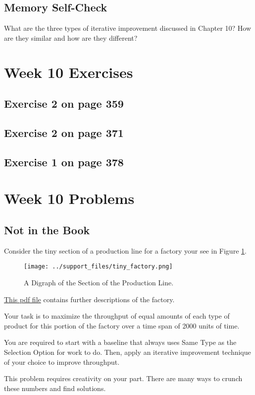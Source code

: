\documentclass[12pt]{amsart}
\begin{document}
\subsection{Memory Self-Check}
What are the three types of iterative improvement discussed in Chapter 10? How are they similar and how are they different?
 \section{Week 10 Exercises}
\subsection{ Exercise 2 on page 359}
\subsection{Exercise 2 on page 371} 
\subsection{Exercise 1 on page 378} 


\section{Week 10 Problems}
\subsection{Not in the Book}
Consider the tiny section of a production line for a factory your see in Figure \ref{fig:factory1}. 
\begin{figure}[htb]
  \texttt{[image: ../support\_files/tiny\_factory.png]}
  \caption{A Digraph of the Section of the Production Line.}
  \label{fig:factory1}
\end{figure}

\href{run:../support_files/tiny_factory_step_descriptions.pdf}{This pdf file} contains further descriptions of the factory.

Your task is to maximize the throughput of equal amounts of each type of product for this portion of the factory over a time span of 2000 units of time.

You are required to start with a baseline that always uses Same Type as the Selection Option for work to do. Then, apply an iterative improvement technique of your choice to improve throughput.

This problem requires creativity on your part. There are many ways to crunch these numbers and find solutions. 
\end{document}
